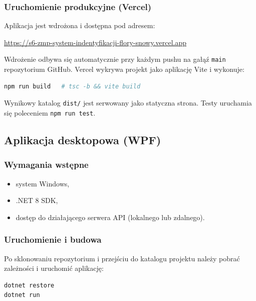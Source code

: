 \documentclass[12pt,a4paper]{article}
\begin{document}
\subsubsection{Uruchomienie produkcyjne (Vercel)}

Aplikacja jest wdro\.zona i dost\k{e}pna pod adresem:

\begin{center}
\url{https://s6-zmp-system-indentyfikacji-flory-snowy.vercel.app}
\end{center}

Wdro\.zenie odbywa si\k{e} automatycznie przy ka\.zdym pushu na ga\l{}\k{a}\'z \texttt{main} repozytorium GitHub. Vercel wykrywa projekt jako aplikacj\k{e} Vite i wykonuje:

\begin{lstlisting}[language=bash, numbers=none]
npm run build   # tsc -b && vite build
\end{lstlisting}

Wynikowy katalog \texttt{dist/} jest serwowany jako statyczna strona. Testy uruchamia si\k{e} poleceniem \texttt{npm run test}.

\subsection{Aplikacja desktopowa (WPF)}

\subsubsection{Wymagania wst\k{e}pne}

\begin{itemize}[label=\textbullet, leftmargin=1.5cm]
    \item system Windows,
    \item .NET 8 SDK,
    \item dost\k{e}p do dzia\l{}aj\k{a}cego serwera API (lokalnego lub zdalnego).
\end{itemize}

\subsubsection{Uruchomienie i budowa}

Po sklonowaniu repozytorium i przej\'sciu do katalogu projektu nale\.zy pobra\'c zale\.zno\'sci i uruchomi\'c aplikacj\k{e}:

\begin{lstlisting}[language=bash, numbers=none]
dotnet restore
dotnet run
\end{lstlisting}
\end{document}
